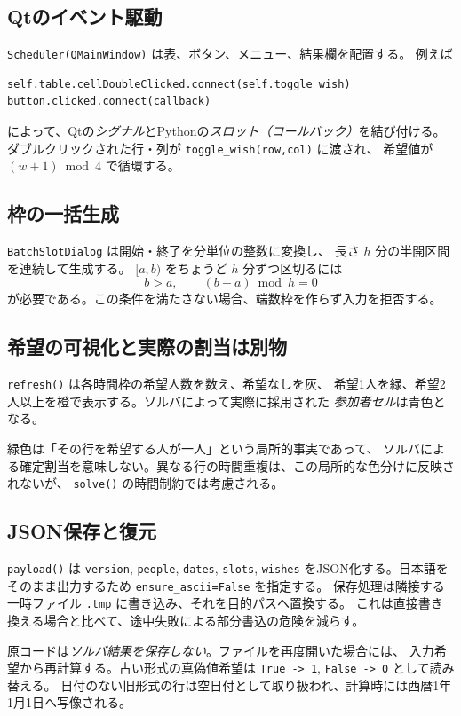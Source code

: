 \documentclass[11pt,a4paper]{ltjsarticle}
\theoremstyle{definition}
\theoremstyle{remark}
\newcommand{\code}[1]{\texttt{#1}}
\begin{document}
\subsection{Qtのイベント駆動}
\code{Scheduler(QMainWindow)} は表、ボタン、メニュー、結果欄を配置する。
例えば
\begin{Verbatim}[fontsize=\small,frame=single]
self.table.cellDoubleClicked.connect(self.toggle_wish)
button.clicked.connect(callback)
\end{Verbatim}
によって、Qtの\emph{シグナル}とPythonの\emph{スロット（コールバック）}を結び付ける。
ダブルクリックされた行・列が \code{toggle\_wish(row,col)} に渡され、
希望値が $(w+1)\bmod4$ で循環する。

\subsection{枠の一括生成}
\code{BatchSlotDialog} は開始・終了を分単位の整数に変換し、
長さ $h$ 分の半開区間を連続して生成する。
$[a,b)$ をちょうど $h$ 分ずつ区切るには
\[
 b>a,\qquad (b-a)\bmod h=0
\]
が必要である。この条件を満たさない場合、端数枠を作らず入力を拒否する。

\subsection{希望の可視化と実際の割当は別物}
\code{refresh()} は各時間枠の希望人数を数え、希望なしを灰、
希望1人を緑、希望2人以上を橙で表示する。ソルバによって実際に採用された
\emph{参加者セル}は青色となる。

緑色は「その行を希望する人が一人」という局所的事実であって、
ソルバによる確定割当を意味しない。異なる行の時間重複は、この局所的な色分けに反映されないが、
\code{solve()} の時間制約では考慮される。

\subsection{JSON保存と復元}
\code{payload()} は
\code{version}, \code{people}, \code{dates}, \code{slots}, \code{wishes}
をJSON化する。日本語をそのまま出力するため \code{ensure\_ascii=False} を指定する。
保存処理は隣接する一時ファイル \code{.tmp} に書き込み、それを目的パスへ置換する。
これは直接書き換える場合と比べて、途中失敗による部分書込の危険を減らす。

原コードは\emph{ソルバ結果を保存しない}。ファイルを再度開いた場合には、
入力希望から再計算する。古い形式の真偽値希望は
\code{True -> 1}, \code{False -> 0} として読み替える。
日付のない旧形式の行は空日付として取り扱われ、計算時には西暦1年1月1日へ写像される。
\end{document}
